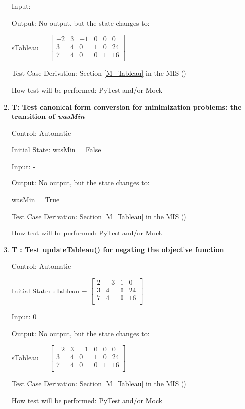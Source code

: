 \documentclass[12pt, titlepage]{article}
\newcounter{testnum} %
\begin{document}
\begin{enumerate}
	Input: -
	
	Output: No output, but the state changes to:
	
	sTableau = $\begin{bmatrix}
	-2 & 3 & -1 & 0 & 0 & 0\\
	3 & 4 & 0 & 1 & 0 & 24\\
	7 & 4 & 0 & 0 & 1 & 16\\
	\end{bmatrix}$
	
	Test Case Derivation: Section \ref{M_Tableau} in the MIS (\cite{losms-mis})
	
	How test will be performed: PyTest and/or Mock
	
	\item{\textbf{T\thetestnum \label{canonicalMin}: 
	Test canonical form conversion for minimization problems: the transition of 
	\textit{wasMin}}}
	
	Control: Automatic 
	
	Initial State: wasMin = False
	
	Input: -
	
	Output: No output, but the state changes to:
	
	wasMin = True
	
	Test Case Derivation: Section \ref{M_Tableau} in the MIS (\cite{losms-mis})
	
	How test will be performed: PyTest and/or Mock
	
	\item{\textbf{T\thetestnum 
	\label{updateTableauNeg}: Test updateTableau() for negating the objective 
	function}}
	
	Control: Automatic 
	
	Initial State: sTableau = $\begin{bmatrix}
	2 & -3 & 1 & 0\\
	3 & 4 & 0 & 24\\
	7 & 4 & 0 & 16\\
	\end{bmatrix}$
	
	Input: 0
	
	Output: No output, but the state changes to:
	
	sTableau = $\begin{bmatrix}
	-2 & 3 & -1 & 0 & 0 & 0\\
	3 & 4 & 0 & 1 & 0 & 24\\
	7 & 4 & 0 & 0 & 1 & 16\\
	\end{bmatrix}$
	
	Test Case Derivation: Section \ref{M_Tableau} in the MIS (\cite{losms-mis})
	
	How test will be performed: PyTest and/or Mock
	

\end{enumerate}
\end{document}
